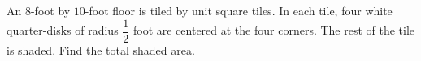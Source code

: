 An $8$-foot by $10$-foot floor is tiled by unit square tiles. In each tile, four white quarter-disks of radius $\dfrac{1}{2}$ foot are centered at the four corners. The rest of the tile is shaded. Find the total shaded area.
